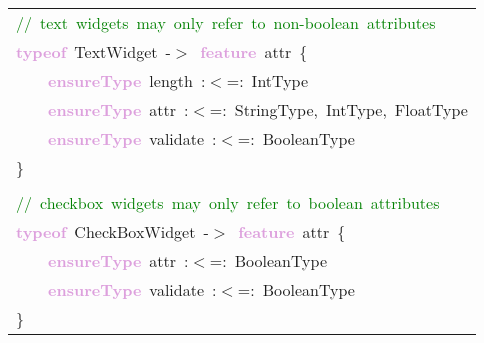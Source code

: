 \begin{tabular}[t]{l}
\noindent
\mbox{}\textcolor{Green}{//\ text\ widgets\ may\ only\ refer\ to\ non-boolean\ attributes\ } \\
\mbox{}\textbf{\textcolor{Plum}{typeof}}\ TextWidget\ -$>$\ \textbf{\textcolor{Plum}{feature}}\ attr\ \{ \\
\mbox{}\ \ \ \ \textbf{\textcolor{Plum}{ensureType}}\ length\ :$<$=:\ IntType \\
\mbox{}\ \ \ \ \textbf{\textcolor{Plum}{ensureType}}\ attr\ :$<$=:\ StringType,\ IntType,\ FloatType \\
\mbox{}\ \ \ \ \textbf{\textcolor{Plum}{ensureType}}\ validate\ :$<$=:\ BooleanType \\
\mbox{}\}\ \  \\
\mbox{} \\
\mbox{}\textcolor{Green}{//\ checkbox\ widgets\ may\ only\ refer\ to\ boolean\ attributes} \\
\mbox{}\textbf{\textcolor{Plum}{typeof}}\ CheckBoxWidget\ -$>$\ \textbf{\textcolor{Plum}{feature}}\ attr\ \{ \\
\mbox{}\ \ \ \ \textbf{\textcolor{Plum}{ensureType}}\ attr\ :$<$=:\ BooleanType \\
\mbox{}\ \ \ \ \textbf{\textcolor{Plum}{ensureType}}\ validate\ :$<$=:\ BooleanType \\
\mbox{}\}
\end{tabular}

